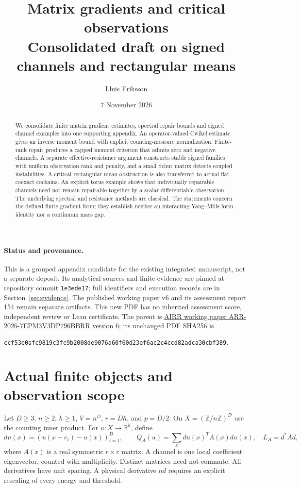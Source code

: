 \documentclass[11pt,a4paper]{article}
\title{Matrix gradients and critical observations\\
\large Consolidated draft on signed channels and rectangular means}
\author{Lluis Eriksson}
\date{7 November 2026}
\newcommand{\R}{\mathbb R}
\begin{document}
\maketitle
\begin{abstract}
We consolidate finite matrix gradient estimates, spectral repair bounds and
signed channel examples into one supporting appendix. An operator-valued
Cwikel estimate gives an inverse moment bound with explicit counting-measure
normalization. Finite-rank repair produces a capped moment criterion that
admits zero and negative channels. A separate effective-resistance argument
constructs stable signed families with uniform observation rank and penalty,
and a small Schur matrix detects coupled instabilities. A critical rectangular mean obstruction is also transferred to actual flat coexact cochains. An explicit torus
example shows that individually repairable channels need not remain
repairable together by a scalar differentiable observation. The underlying
spectral and resistance methods are classical. The statements concern the
defined finite gradient form; they establish neither an interacting
Yang--Mills form identity nor a continuum mass gap.
\end{abstract}

\paragraph{Status and provenance.}
This is a grouped appendix candidate for the existing integrated manuscript,
not a separate deposit. Its analytical sources and finite evidence are pinned
at repository commit \texttt{1e3ede17}; full identifiers and execution records
are in Section~\ref{sec:evidence}. The published working paper v6 and its
assessment report 154 remain separate artifacts. This new PDF has no inherited
assessment score, independent review or Lean certificate.
The parent is
\href{https://airr.science/papers/ARR-2026-7EPM3V3DP796BBRR/versions/v6/}
{AIRR working paper ARR-2026-7EPM3V3DP796BBRR version 6}; its unchanged PDF
SHA256 is
\begin{center}\scriptsize
\texttt{ccf53e0afc9819c3fc9b2008de9076a60f60d23ef6ac2c4ccd82adca30cbf389}.
\end{center}

\section{Actual finite objects and observation scope}
Let $D\geq3$, $n\geq2$, $h\geq1$, $V=n^D$, $r=Dh$, and $p=D/2$.
On $X=(\mathbb Z/n\mathbb Z)^D$ use the counting inner product. For
$u:X\to\R^h$, define
\[
 du(x)=(u(x+e_i)-u(x))_{i=1}^D,\qquad
 Q_A(u)=\sum_x du(x)^T A(x)du(x),\quad L_A=d^*A d,
\]
where $A(x)$ is a real symmetric $r\times r$ matrix. A channel is one local
coefficient eigenvector, counted with multiplicity. Distinct matrices need
not commute. All derivatives have unit spacing. A physical derivative $nd$
requires an explicit rescaling of every energy and threshold.
\end{document}
